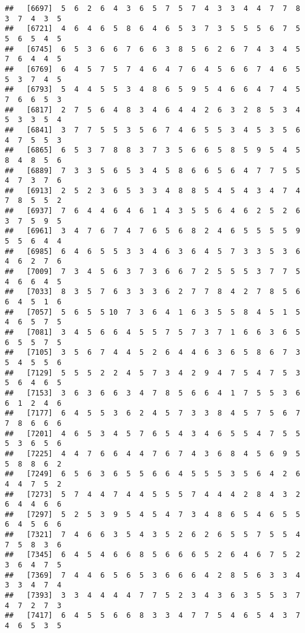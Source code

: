 \documentclass[
]{book}
\begin{document}
\begin{verbatim}
##   [6697]  5  6  2  6  4  3  6  5  7  5  7  4  3  3  4  4  7  7  8  3  7  4  3  5
##   [6721]  4  6  4  6  5  8  6  4  6  5  3  7  3  5  5  5  6  7  5  5  6  5  4  5
##   [6745]  6  5  3  6  6  7  6  6  3  8  5  6  2  6  7  4  3  4  5  7  6  4  4  5
##   [6769]  6  4  5  7  5  7  4  6  4  7  6  4  5  6  6  7  4  6  5  5  3  7  4  5
##   [6793]  5  4  4  5  5  3  4  8  6  5  9  5  4  6  6  4  7  4  5  7  6  6  5  3
##   [6817]  2  7  5  6  4  8  3  4  6  4  4  2  6  3  2  8  5  3  4  5  3  3  5  4
##   [6841]  3  7  7  5  5  3  5  6  7  4  6  5  5  3  4  5  3  5  6  4  7  5  5  3
##   [6865]  6  5  3  7  8  8  3  7  3  5  6  6  5  8  5  9  5  4  5  8  4  8  5  6
##   [6889]  7  3  3  5  6  5  3  4  5  8  6  6  5  6  4  7  7  5  5  4  7  3  7  6
##   [6913]  2  5  2  3  6  5  3  3  4  8  8  5  4  5  4  3  4  7  4  7  8  5  5  2
##   [6937]  7  6  4  4  6  4  6  1  4  3  5  5  6  4  6  2  5  2  6  3  7  5  9  5
##   [6961]  3  4  7  6  7  4  7  6  5  6  8  2  4  6  5  5  5  5  9  5  5  6  4  4
##   [6985]  6  4  6  5  5  3  3  4  6  3  6  4  5  7  3  3  5  3  6  4  6  2  7  6
##   [7009]  7  3  4  5  6  3  7  3  6  6  7  2  5  5  5  3  7  7  5  4  6  6  4  5
##   [7033]  8  3  5  7  6  3  3  3  6  2  7  7  8  4  2  7  8  5  6  6  4  5  1  6
##   [7057]  5  6  5  5 10  7  3  6  4  1  6  3  5  5  8  4  5  1  5  4  6  5  7  5
##   [7081]  3  4  5  6  6  4  5  5  7  5  7  3  7  1  6  6  3  6  5  6  5  5  7  5
##   [7105]  3  5  6  7  4  4  5  2  6  4  4  6  3  6  5  8  6  7  3  5  4  5  5  6
##   [7129]  5  5  5  2  2  4  5  7  3  4  2  9  4  7  5  4  7  5  3  5  6  4  6  5
##   [7153]  3  6  3  6  6  3  4  7  8  5  6  6  4  1  7  5  5  3  6  6  1  2  4  6
##   [7177]  6  4  5  5  3  6  2  4  5  7  3  3  8  4  5  7  5  6  7  7  8  6  6  6
##   [7201]  4  6  5  3  4  5  7  6  5  4  3  4  6  5  5  4  7  5  5  5  3  6  5  6
##   [7225]  4  4  7  6  6  4  4  7  6  7  4  3  6  8  4  5  6  9  5  5  8  8  6  2
##   [7249]  6  5  6  3  6  5  5  6  6  4  5  5  5  3  5  6  4  2  6  4  4  7  5  2
##   [7273]  5  7  4  4  7  4  4  5  5  5  7  4  4  4  2  8  4  3  2  6  4  4  6  6
##   [7297]  5  2  5  3  9  5  4  5  4  7  3  4  8  6  5  4  6  5  5  6  4  5  6  6
##   [7321]  7  4  6  6  3  5  4  3  5  2  6  2  6  5  5  7  5  5  4  7  5  8  3  6
##   [7345]  6  4  5  4  6  6  8  5  6  6  6  5  2  6  4  6  7  5  2  3  6  4  7  5
##   [7369]  7  4  4  6  5  6  5  3  6  6  6  4  2  8  5  6  3  3  4  3  3  4  7  4
##   [7393]  3  3  4  4  4  4  7  7  5  2  3  4  3  6  3  5  5  3  7  4  7  2  7  3
##   [7417]  6  4  5  5  6  6  8  3  3  4  7  7  5  4  6  5  4  3  7  4  6  5  3  5

\end{verbatim}
\end{document}

